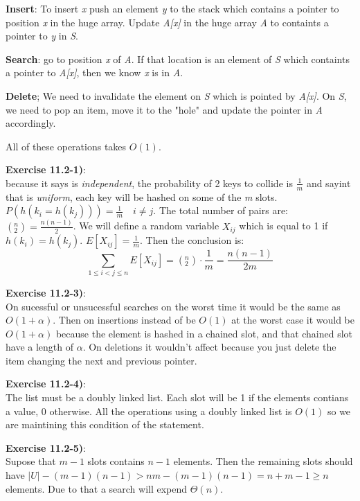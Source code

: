 \documentclass{article}
\newcounter{exercise}[section]   %
\begin{document}
\textbf{Insert}: To insert \textit{x} push an element \textit{y} to the stack which contains
a pointer to position \textit{x} in the huge array. Update \textit{A[x]} in the huge array 
\textit{A} to containts a pointer to \textit{y} in \textit{S}.

\textbf{Search}: go to position \textit{x} of \textit{A}. If that location is an element of
\textit{S} which containts a pointer to \textit{A[x]}, then we know \textit{x} is in \textit{A}.

\textbf{Delete}; We need to invalidate the element on \textit{S} which is pointed by 
\textit{A[x]}. On \textit{S}, we need to pop an item, move it to the "hole" and update the 
pointer in \textit{A} accordingly.

All of these operations takes \(O(1)\).

\textbf{Exercise 11.2-1)}:\\
because it says is \textit{independent}, the probability of 2 keys to collide is \(\frac{1}{m}\)
and sayint that is \textit{uniform}, each key will be hashed on some of the \textit{m} slots.
\(P(h(k_i = h(k_j))) = \frac{1}{m} \quad i \neq j\). The total number of pairs are:
\(\left(^n_2\right) = \frac{n(n - 1)}{2}\). We will define a random variable \(X_{ij}\) which
is equal to 1 if \(h(k_i) = h(k_j)\). \(E[X_{ij}] = \frac{1}{m}\).
Then the conclusion is:
\[
\sum_{1 \leq i < j \leq n} E[X_{ij}] = \left(^n_2\right) \cdot \frac{1}{m} = \frac{n(n - 1)}
{2m}
\]

\textbf{Exercise 11.2-3)}:\\
On sucessful or unsucessful searches on the worst time it would be the same as \(O(1 + \alpha)\).
Then on insertions instead of be \(O(1)\) at the worst case it would be \(O(1 + \alpha)\) 
because the element is hashed in a chained slot, and that chained slot have a length of 
\(\alpha\). On deletions it wouldn't affect because you just delete the item changing the 
next and previous pointer. 

\textbf{Exercise 11.2-4)}:\\
The list must be a doubly linked list. Each slot will be 1 if the elements contians a value,
0 otherwise. All the operations using a doubly linked list is \(O(1)\) so we are maintining
this condition of the statement.

\textbf{Exercise 11.2-5)}:\\
Supose that \(m - 1\) slots contains \(n - 1\) elements. Then the remaining slots should
have \(|U| - (m - 1)(n - 1) > nm - (m - 1)(n - 1) = n + m - 1 \geq n\) elements. Due to that
a search will expend \(\Theta(n)\).
\end{document}
